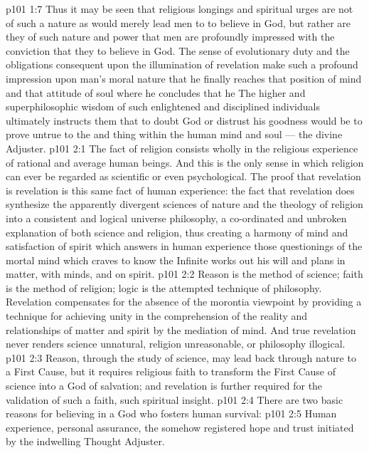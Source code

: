 \vs p101 1:7 Thus it may be seen that religious longings and spiritual urges are not of such a nature as would merely lead men to  to believe in God, but rather are they of such nature and power that men are profoundly impressed with the conviction that they  to believe in God. The sense of evolutionary duty and the obligations consequent upon the illumination of revelation make such a profound impression upon man’s moral nature that he finally reaches that position of mind and that attitude of soul where he concludes that he  The higher and superphilosophic wisdom of such enlightened and disciplined individuals ultimately instructs them that to doubt God or distrust his goodness would be to prove untrue to the  and  thing within the human mind and soul --- the divine Adjuster.
\vs p101 2:1 The fact of religion consists wholly in the religious experience of rational and average human beings. And this is the only sense in which religion can ever be regarded as scientific or even psychological. The proof that revelation is revelation is this same fact of human experience: the fact that revelation does synthesize the apparently divergent sciences of nature and the theology of religion into a consistent and logical universe philosophy, a co\hyp{}ordinated and unbroken explanation of both science and religion, thus creating a harmony of mind and satisfaction of spirit which answers in human experience those questionings of the mortal mind which craves to know  the Infinite works out his will and plans in matter, with minds, and on spirit.
\vs p101 2:2 Reason is the method of science; faith is the method of religion; logic is the attempted technique of philosophy. Revelation compensates for the absence of the morontia viewpoint by providing a technique for achieving unity in the comprehension of the reality and relationships of matter and spirit by the mediation of mind. And true revelation never renders science unnatural, religion unreasonable, or philosophy illogical.
\vs p101 2:3 Reason, through the study of science, may lead back through nature to a First Cause, but it requires religious faith to transform the First Cause of science into a God of salvation; and revelation is further required for the validation of such a faith, such spiritual insight.
\vs p101 2:4 There are two basic reasons for believing in a God who fosters human survival:
\vs p101 2:5 \bibnobreakspace Human experience, personal assurance, the somehow registered hope and trust initiated by the indwelling Thought Adjuster.
